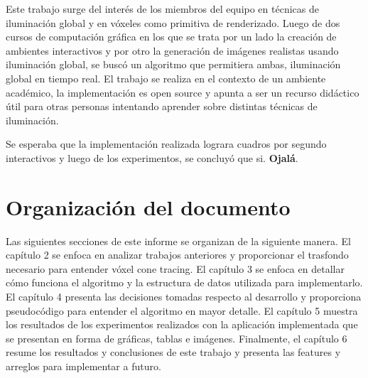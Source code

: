 Este trabajo surge del interés de los miembros del equipo en técnicas de iluminación global y en vóxeles como primitiva de renderizado.
Luego de dos cursos de computación gráfica en los que se trata por un lado la creación de ambientes interactivos y por otro la generación de imágenes realistas usando iluminación global, se buscó un algoritmo que permitiera ambas, iluminación global en tiempo real.
El trabajo se realiza en el contexto de un ambiente académico, la implementación es open source y apunta a ser un recurso didáctico útil para otras personas intentando aprender sobre distintas técnicas de iluminación.

Se esperaba que la implementación realizada lograra cuadros por segundo interactivos y luego de los experimentos, se concluyó que si. \textbf{Ojalá}.

\section{Organización del documento}

Las siguientes secciones de este informe se organizan de la siguiente manera.
El capítulo 2 se enfoca en analizar trabajos anteriores y proporcionar el trasfondo necesario para entender vóxel cone tracing.
El capítulo 3 se enfoca en detallar cómo funciona el algoritmo y la estructura de datos utilizada para implementarlo.
El capítulo 4 presenta las decisiones tomadas respecto al desarrollo y proporciona pseudocódigo para entender el algoritmo en mayor detalle.
El capítulo 5 muestra los resultados de los experimentos realizados con la aplicación implementada que se presentan en forma de gráficas, tablas e imágenes.
Finalmente, el capítulo 6 resume los resultados y conclusiones de este trabajo y presenta las features y arreglos para implementar a futuro.
